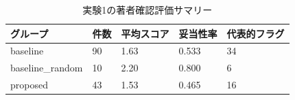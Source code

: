 \begin{table}[tbp]
\centering
\small
\caption{実験1の著者確認評価サマリー}
\label{tab:experiment1\_results}
\begin{tabular}{lllll}
\toprule
グループ & 件数 & 平均スコア & 妥当性率 & 代表的フラグ \\
\midrule
baseline & 90 & 1.63 & 0.533 & 34 \\
baseline\_random & 10 & 2.20 & 0.800 & 6 \\
proposed & 43 & 1.53 & 0.465 & 16 \\
\bottomrule
\end{tabular}
\end{table}
